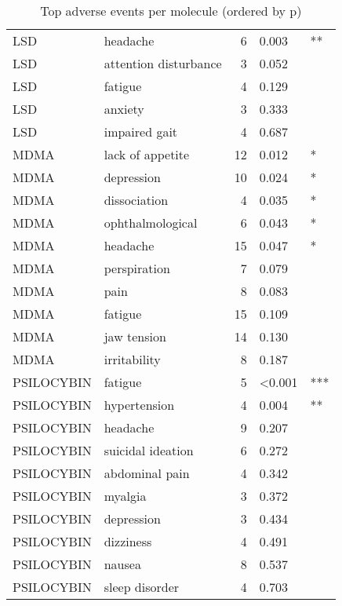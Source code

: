 \begin{table}[!h]
\centering
\caption{Top adverse events per molecule (ordered by p)}
\centering
\begin{tabular}[t]{llrll}
\toprule
LSD & headache & 6 & 0.003 & **\\
LSD & attention disturbance & 3 & 0.052 & \\
LSD & fatigue & 4 & 0.129 & \\
LSD & anxiety & 3 & 0.333 & \\
LSD & impaired gait & 4 & 0.687 & \\
\addlinespace
MDMA & lack of appetite & 12 & 0.012 & *\\
MDMA & depression & 10 & 0.024 & *\\
MDMA & dissociation & 4 & 0.035 & *\\
MDMA & ophthalmological & 6 & 0.043 & *\\
MDMA & headache & 15 & 0.047 & *\\
\addlinespace
MDMA & perspiration & 7 & 0.079 & \\
MDMA & pain & 8 & 0.083 & \\
MDMA & fatigue & 15 & 0.109 & \\
MDMA & jaw tension & 14 & 0.130 & \\
MDMA & irritability & 8 & 0.187 & \\
\addlinespace
PSILOCYBIN & fatigue & 5 & <0.001 & ***\\
PSILOCYBIN & hypertension & 4 & 0.004 & **\\
PSILOCYBIN & headache & 9 & 0.207 & \\
PSILOCYBIN & suicidal ideation & 6 & 0.272 & \\
PSILOCYBIN & abdominal pain & 4 & 0.342 & \\
\addlinespace
PSILOCYBIN & myalgia & 3 & 0.372 & \\
PSILOCYBIN & depression & 3 & 0.434 & \\
PSILOCYBIN & dizziness & 4 & 0.491 & \\
PSILOCYBIN & nausea & 8 & 0.537 & \\
PSILOCYBIN & sleep disorder & 4 & 0.703 & \\
\bottomrule
\end{tabular}
\end{table}
